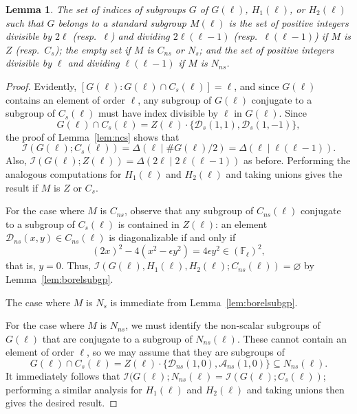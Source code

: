 \documentclass[table,dvipsnames]{amsart}
\newcommand{\F}{\mathbb{F}}
\newcommand{\I}{\mathcal{I}}
\newtheorem{lemma}[theorem]{Lemma}
\numberwithin{equation}{section}
\newcommand{\s}{\textit{s}}
\newcommand{\ns}{\textit{ns}}
\newcommand{\Cs}{C_\s}
\newcommand{\Cns}{C_\ns}
\newcommand{\Ns}{N_\s}
\newcommand{\Nns}{N_\ns}
\begin{document}
\begin{lemma}
\label{lem:bm}
The set of indices of subgroups $G$ of $G(\ell)$, $H_1(\ell)$, or $H_2(\ell)$ such that $G$ belongs to a standard subgroup $M(\ell)$ is the set of positive integers divisible by $2\ell$ (resp.\ $\ell$) and dividing $2\ell(\ell-1)$ (resp.\ $\ell(\ell-1)$) if $M$ is $Z$ (resp.\ $\Cs$); the empty set if $M$ is $\Cns$ or $\Ns$; and the set of positive integers divisible by $\ell$ and dividing $\ell(\ell-1)$ if $M$ is $\Nns$.
\end{lemma}
\begin{proof}
Evidently, $[G(\ell):G(\ell)\cap\Cs(\ell)]=\ell$, and since $G(\ell)$ contains an element of order $\ell$, any subgroup of $G(\ell)$ conjugate to a subgroup of $\Cs(\ell)$ must have index divisible by $\ell$ in $G(\ell)$. Since
\begin{equation*}
G(\ell)\cap\Cs(\ell)=Z(\ell)\cdot\{\mathcal{D}_s(1,1),\mathcal{D}_s(1,-1)\},
\end{equation*}
the proof of Lemma~\ref{lem:ncs} shows that 
\begin{equation*}
\I(G(\ell);\Cs(\ell))=\Delta(\ell\mid\#G(\ell)/2)=\Delta(\ell\mid\ell(\ell-1)).
\end{equation*}
Also, $\I(G(\ell);Z(\ell))=\Delta(2\ell\mid 2\ell(\ell-1))$ as before. Performing the analogous computations for $H_1(\ell)$ and $H_2(\ell)$ and taking unions gives the result if $M$ is $Z$ or $\Cs$.

For the case where $M$ is $\Cns$, observe that any subgroup of $\Cns(\ell)$ conjugate to a subgroup of $\Cs(\ell)$ is contained in $Z(\ell)$: an element $\mathcal{D}_\ns(x,y)\in\Cns(\ell)$ is diagonalizable if and only if
\begin{equation*}
(2x)^2-4(x^2-\epsilon y^2)=4\epsilon y^2\in(\F_\ell)^2,
\end{equation*}
that is, $y=0$. Thus, $\I(G(\ell),H_1(\ell),H_2(\ell);\Cns(\ell))=\varnothing$ by Lemma~\ref{lem:borelsubgp}.

The case where $M$ is $\Ns$ is immediate from Lemma~\ref{lem:borelsubgp}.

For the case where $M$ is $\Nns$, we must identify the non-scalar subgroups of $G(\ell)$ that are conjugate to a subgroup of $\Nns(\ell)$. These cannot contain an element of order $\ell$, so we may assume that they are subgroups of
\begin{equation*}
G(\ell)\cap\Cs(\ell)=Z(\ell)\cdot\{\mathcal{D}_\ns(1,0),\mathcal{A}_\ns(1,0)\}\subseteq\Nns(\ell).
\end{equation*}
It immediately follows that $\I(G(\ell);\Nns(\ell)=\I(G(\ell);\Cs(\ell))$; performing a similar analysis for $H_1(\ell)$ and $H_2(\ell)$ and taking unions then gives the desired result.
\end{proof}
\end{document}
